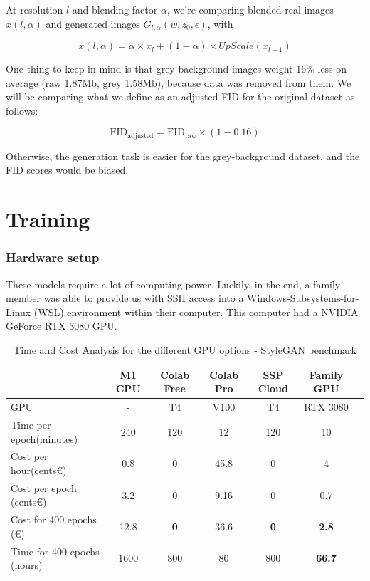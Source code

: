 \documentclass{article}
\begin{document}
At resolution $l$ and blending factor $\alpha$, we're comparing blended real images $x(l, \alpha)$ and generated images $G_{l, \alpha}(w, z_0, \epsilon)$, with

\[ x(l, \alpha) = \alpha \times x_{l} + (1-\alpha) \times UpScale(x_{l-1}) \]

One thing to keep in mind is that grey-background images weight 16\% less on average (raw 1.87Mb, grey 1.58Mb), because data was removed from them. We will be comparing what we define as an adjusted FID for the original dataset as follows:

\[ \text{FID}_{\text{adjusted}} = \text{FID}_{\text{raw}} \times (1 - 0.16) \]

Otherwise, the generation task is easier for the grey-background dataset, and the FID scores would be biased.

\section{Training}

\subsubsection*{Hardware setup}

These models require a lot of computing power. Luckily, in the end, a family member was able to provide us with SSH access into a Windows-Subsystems-for-Linux (WSL) environment within their computer. This computer had a NVIDIA GeForce RTX 3080 GPU.

\begin{table}[H]
  \centering
  \begin{tabular}{lcccccl}
    \toprule
    & \multicolumn{1}{c}{M1 CPU} & \multicolumn{1}{c}{Colab Free} & \multicolumn{1}{c}{Colab Pro} & \multicolumn{1}{c}{SSP Cloud\footnotemark} & \multicolumn{1}{c}{Family GPU} \\
    \midrule
    GPU & - & T4 & V100 & T4 & RTX 3080 \\
    Time per epoch\footnotemark (minutes) & 240 & 120 & 12 & 120 & 10 \\
    Cost per hour\footnotemark (cents€) & 0.8 & 0 & 45.8\footnotemark & 0 & 4 \\
    Cost per epoch (cents€) & 3.2 & 0 & 9.16 & 0 & 0.7 \\
    Cost for 400 epochs (€) & 12.8 & \textbf{0} & 36.6 & \textbf{0} & \textbf{2.8} \\
    Time for 400 epochs (hours) & 1600 & 800 & 80 & 800 & \textbf{66.7} \\
    \bottomrule
  \end{tabular}
  \caption{Time and Cost Analysis for the different GPU options - StyleGAN benchmark}
\end{table}
\end{document}
